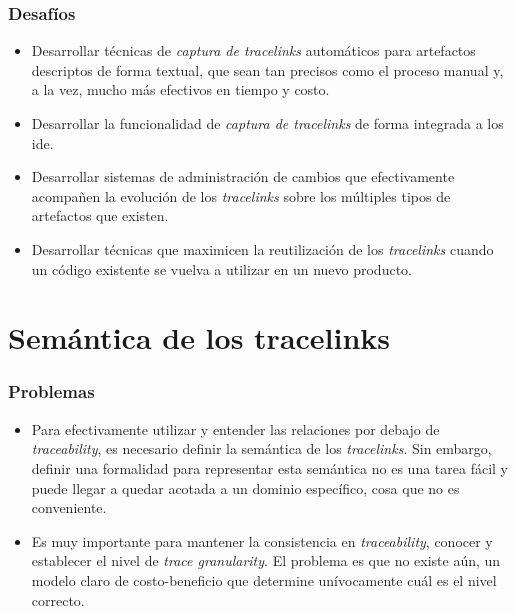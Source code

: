 \documentclass[a4paper,12pt,oneside,spanish]{book}
\begin{document}
\subsubsection{Desafíos}

\begin{itemize}[label={\checkmark}]

\item Desarrollar técnicas de \textit{captura de tracelinks} automáticos para artefactos descriptos de forma textual, que sean tan precisos como el proceso manual y, a la vez, mucho más efectivos en tiempo y costo.

\item Desarrollar la funcionalidad de \textit{captura de tracelinks} de forma integrada a los \gls{ide}.

\item Desarrollar sistemas de administración de cambios que efectivamente acompañen la evolución de los \textit{tracelinks} sobre los múltiples tipos de artefactos que existen.

\item Desarrollar técnicas que maximicen la reutilización de los \textit{tracelinks} cuando un código existente se vuelva a utilizar en un nuevo producto.

\end{itemize}

\section{Semántica de los tracelinks}
\label{sec:SemanticaTracelinks}

\subsubsection{Problemas}

\begin{itemize}[label={$\times$}]

\item Para efectivamente utilizar y entender las relaciones por debajo de \textit{traceability}, es necesario definir la semántica de los \textit{tracelinks}. Sin embargo, definir una formalidad para representar esta semántica no es una tarea fácil y puede llegar a quedar acotada a un dominio específico, cosa que no es conveniente.

\item Es muy importante para mantener la consistencia en \textit{traceability}, conocer y establecer el nivel de \textit{trace granularity}. El problema es que no existe aún, un modelo claro de costo-beneficio que determine unívocamente cuál es el nivel correcto.

\end{itemize}
\end{document}
